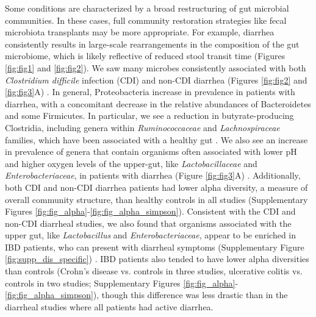 \documentclass{article}
\begin{document}
Some conditions are characterized by a broad restructuring of gut microbial communities.
In these cases, full community restoration strategies like fecal microbiota transplants may be more appropriate.
For example, diarrhea consistently results in large-scale rearrangements in the composition of the gut microbiome, which is likely reflective of reduced stool transit time (Figures \ref{fig:fig1} and \ref{fig:fig2}).
We saw many microbes consistently associated with both \textit{Clostridium difficile} infection (CDI) and non-CDI diarrhea (Figures \ref{fig:fig2} and \ref{fig:fig3}A) \cite{cdi-youngster,cdi-schubert,cdi-vincent,edd-singh}.
In general, Proteobacteria increase in prevalence in patients with diarrhea, with a concomitant decrease in the relative abundances of Bacteroidetes and some Firmicutes. 
In particular, we see a reduction in butyrate-producing Clostridia, including genera within \textit{Ruminococcaceae} and \textit{Lachnospiraceae} families, which have been associated with a healthy gut \cite{wong2006colonic}. 
We also see an increase in prevalence of genera that contain organisms often associated with lower pH and higher oxygen levels of the upper-gut, like \textit{Lactobacillaceae} and \textit{Enterobacteriaceae}, in patients with diarrhea (Figure \ref{fig:fig3}A) \cite{donaldson2016gut}. 
Additionally, both CDI and non-CDI diarrhea patients had lower alpha diversity, a measure of overall community structure, than healthy controls in all studies (Supplementary Figures \ref{fig:fig_alpha}-\ref{fig:fig_alpha_simpson}).
Consistent with the CDI and non-CDI diarrheal studies, we also found that organisms associated with the upper gut, like \textit{Lactobacillus} and \textit{Enterobacteriaceae}, appear to be enriched in IBD patients, who can present with diarrheal symptoms (Supplementary Figure \ref{fig:supp_dis_specific}) \cite{donaldson2016gut,Kirsner1982ibd}. 
IBD patients also tended to have lower alpha diversities than controls (Crohn's disease vs. controls in three studies, ulcerative colitis vs. controls in two studies; Supplementary Figures \ref{fig:fig_alpha}-\ref{fig:fig_alpha_simpson}), though this difference was less drastic than in the diarrheal studies where all patients had active diarrhea.
\end{document}
